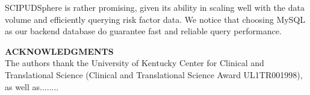 \documentclass{amia}
\begin{document}
SCIPUDSphere is rather promising, given its ability in scaling well with the data volume and efficiently querying risk factor data. We notice that choosing MySQL as our backend database do guarantee fast and reliable query performance.


\textbf{ACKNOWLEDGMENTS}\\
The authors thank the University of Kentucky Center for Clinical and Translational Science (Clinical and Translational Science Award UL1TR001998), as well as........

\makeatletter
\renewcommand{\@biblabel}[1]{\hfill #1.}
\makeatother
\end{document}
